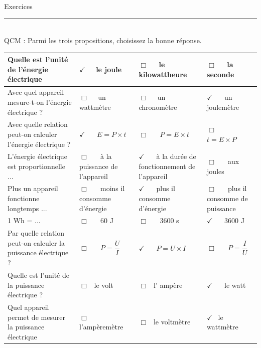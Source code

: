\documentclass[11pt,a4paper]{article}
\begin{document}
\begin{center}
 \LARGE{Exercices } \\[3mm]
\end{center}



\normalsize

\hrule\
\\[0,5cm]


 QCM : Parmi les trois propositions, choisissez la bonne réponse. 

\vspace{2cm}
\begin{center}



    \begin{tabular}{|p{6cm}|C{3cm}|C{3cm}|C{3cm}|}
         \hline
        Quelle est l'unité de l'énergie électrique& $\checkmark $ ~~le joule & $\Box $ ~~le kilowattheure    & $\Box $ ~~la seconde \\
         \hline
       Avec quel appareil mesure-t-on l'énergie électrique ?  & $\Box $ ~~un wattmètre & $\Box $ ~~un chronomètre  & $\checkmark $ ~~ un joulemètre  \\
         \hline
          Avec quelle relation peut-on calculer l'énergie électrique ?  & $\checkmark $ ~~ $E= P \times t$  &$\Box $ ~~ $P=E \times t$  & $\Box $ ~~$t=E \times P$  \\
         \hline
          L'énergie électrique est proportionnelle ... & $\Box $ ~~ à la puissance de l'appareil & $\checkmark $ ~~ à la durée de fonctionnement de l'appareil & $\Box $ ~~ aux joules \\
         \hline
          Plus un appareil fonctionne longtemps ... &$\Box $ ~~ moins il consomme d'énergie & $\checkmark $ ~~ plus il consomme d'énergie & $\Box $ ~~ plus il consomme de puissance \\
         \hline
          1 Wh = ... & $\Box $ ~~ 60 J & $\Box $ ~~  3600 s & $\checkmark $ ~~  3600 J \\
         \hline
          Par quelle relation peut-on calculer la puissance électrique ? & $\Box $ ~~ $P=\dfrac{U}{I}$ & $\checkmark $ ~~ $P=U \times I$ &  $\Box $ ~~ $P=\dfrac{I}{U}$ \\
         \hline
          Quelle est l'unité de la puissance électrique ? &$\Box ~~ $ le volt &$\Box ~~ $ l' ampère &$\checkmark $ ~~  le watt \\
         \hline
          Quel appareil permet de mesurer la puissance électrique &$\Box ~~ $ l'ampèremètre &$\Box ~~ $ le voltmètre &$\checkmark  ~~ $ le wattmètre \\
         \hline 

         
        
    \end{tabular}
\end{center}
\end{document}
